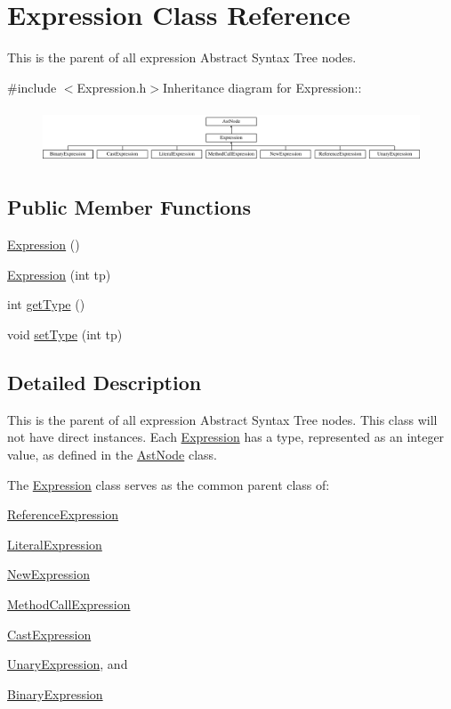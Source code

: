 \hypertarget{classExpression}{
\section{Expression Class Reference}
\label{classExpression}
}


This is the parent of all expression Abstract Syntax Tree nodes.  


{\ttfamily \#include $<$Expression.h$>$}Inheritance diagram for Expression::\begin{figure}[H]
\begin{center}
\leavevmode
\includegraphics[height=1.64384cm]{classExpression}
\end{center}
\end{figure}
\subsection*{Public Member Functions}
\begin{DoxyCompactItemize}
\item 
\hyperlink{classExpression_afcf87716bf0abfe8d414c92529e1564a}{Expression} ()
\item 
\hyperlink{classExpression_a3b3e124dd46ae70e1aae195089e839ab}{Expression} (int tp)
\item 
int \hyperlink{classExpression_add42721451cd946ac4e02ced146b95b7}{getType} ()
\item 
void \hyperlink{classExpression_ac2a2e67e764dd3ed9733b9cfd3e27f26}{setType} (int tp)
\end{DoxyCompactItemize}


\subsection{Detailed Description}
This is the parent of all expression Abstract Syntax Tree nodes. This class will not have direct instances. Each \hyperlink{classExpression}{Expression} has a type, represented as an integer value, as defined in the \hyperlink{classAstNode}{AstNode} class.

The \hyperlink{classExpression}{Expression} class serves as the common parent class of:


\begin{DoxyItemize}
\item \hyperlink{classReferenceExpression}{ReferenceExpression}
\item \hyperlink{classLiteralExpression}{LiteralExpression}
\item \hyperlink{classNewExpression}{NewExpression}
\item \hyperlink{classMethodCallExpression}{MethodCallExpression}
\item \hyperlink{classCastExpression}{CastExpression}
\item \hyperlink{classUnaryExpression}{UnaryExpression}, and
\item \hyperlink{classBinaryExpression}{BinaryExpression} 
\end{DoxyItemize}

